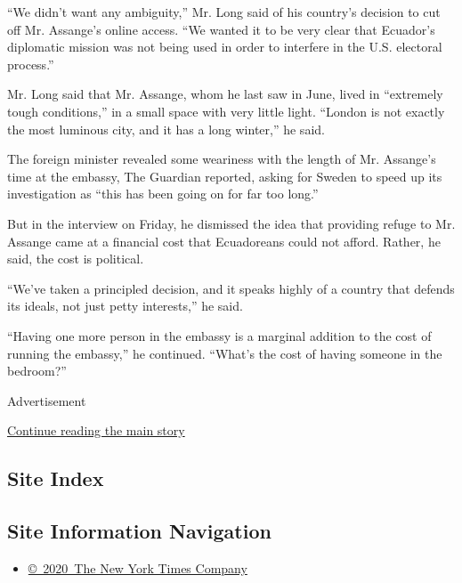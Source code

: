 ``We didn't want any ambiguity,'' Mr. Long said of his country's
decision to cut off Mr. Assange's online access. ``We wanted it to be
very clear that Ecuador's diplomatic mission was not being used in order
to interfere in the U.S. electoral process.''

Mr. Long said that Mr. Assange, whom he last saw in June, lived in
``extremely tough conditions,'' in a small space with very little light.
``London is not exactly the most luminous city, and it has a long
winter,'' he said.

The foreign minister revealed some weariness with the length of Mr.
Assange's time at the embassy, The Guardian reported, asking for Sweden
to speed up its investigation as ``this has been going on for far too
long.''

But in the interview on Friday, he dismissed the idea that providing
refuge to Mr. Assange came at a financial cost that Ecuadoreans could
not afford. Rather, he said, the cost is political.

``We've taken a principled decision, and it speaks highly of a country
that defends its ideals, not just petty interests,'' he said.

``Having one more person in the embassy is a marginal addition to the
cost of running the embassy,'' he continued. ``What's the cost of having
someone in the bedroom?''

Advertisement

\protect\hyperlink{after-bottom}{Continue reading the main story}

\hypertarget{site-index}{%
\subsection{Site Index}\label{site-index}}

\hypertarget{site-information-navigation}{%
\subsection{Site Information
Navigation}\label{site-information-navigation}}

\begin{itemize}
\tightlist
\item
  \href{https://help.nytimes.com/hc/en-us/articles/115014792127-Copyright-notice}{©~2020~The
  New York Times Company}
\end{itemize}

